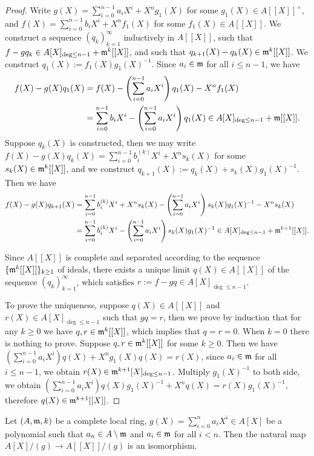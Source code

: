 \begin{proof}
\leanok
Write $g(X)=\sum_{i=0}^{n-1}a_iX^i+X^ng_1(X)$ for some $g_1(X)\in A[[X]]^\times$, and
$f(X)=\sum_{i=0}^{n-1}b_iX^i+X^nf_1(X)$ for some $f_1(X)\in A[[X]]$.
We construct a sequence $(q_k)_{k=1}^\infty$ inductively in $A[[X]]$,
such that $f-gq_k\in A[X]_{\deg\leq n-1}+{\mathfrak{m}}^k[[X]]$,
and such that $q_{k+1}(X)-q_k(X)\in{\mathfrak{m}}^k[[X]]$.
We construct $q_1(X):=f_1(X)g_1(X)^{-1}$.
Since $a_i\in{\mathfrak{m}}$ for all $i\leq n-1$, we have
\begin{align*}
f(X)-g(X)q_1(X)&=f(X)-\left(\sum_{i=0}^{n-1}a_iX^i\right)q_1(X)
-X^nf_1(X) \\
&=\sum_{i=0}^{n-1}b_iX^i-\left(\sum_{i=0}^{n-1}a_iX^i\right)q_1(X)
\in A[X]_{\deg\leq n-1}+{\mathfrak{m}}[[X]].
\end{align*}
Suppose $q_k(X)$ is constructed, then we may write
$f(X)-g(X)q_k(X)=\sum_{i=0}^{n-1}b_i^{(k)}X^i+X^ns_k(X)$
for some $s_k(X)\in{\mathfrak{m}}^k[[X]]$, and we construct
$q_{k+1}(X):=q_k(X)+s_k(X)g_1(X)^{-1}$. Then we have
\begin{align*}
f(X)-g(X)q_{k+1}(X)&=\sum_{i=0}^{n-1}b_i^{(k)}X^i+X^ns_k(X)
-\left(\sum_{i=0}^{n-1}a_iX^i\right)s_k(X)g_1(X)^{-1}
-X^ns_k(X) \\
&=\sum_{i=0}^{n-1}b_i^{(k)}X^i-\left(\sum_{i=0}^{n-1}a_iX^i\right)s_k(X)g_1(X)^{-1}
\in A[X]_{\deg\leq n-1}+{\mathfrak{m}}^{k+1}[[X]].
\end{align*}

Since $A[[X]]$ is complete and separated according to the sequence
$\{{\mathfrak{m}}^k[[X]]\}_{k\geq 1}$ of ideals, there exists a unique limit $q(X)\in A[[X]]$
of the sequence $(q_k)_{k=1}^\infty$, which satisfies $r:=f-gq\in A[X]_{\deg\leq n-1}$.

To prove the uniqueness, suppose $q(X)\in A[[X]]$ and $r(X)\in A[X]_{\deg\leq n-1}$
such that $gq=r$, then we prove by induction that for any $k\geq 0$
we have $q,r\in{\mathfrak{m}}^k[[X]]$, which implies that $q=r=0$.
When $k=0$ there is nothing to prove. Suppose $q,r\in{\mathfrak{m}}^k[[X]]$ for some $k\geq 0$.
Then we have $(\sum_{i=0}^{n-1}a_iX^i)q(X)+X^ng_1(X)q(X)=r(X)$,
since $a_i\in{\mathfrak{m}}$ for all $i\leq n-1$, we obtain $r(X)\in{\mathfrak{m}}^{k+1}[X]_{\deg\leq n-1}$.
Multiply $g_1(X)^{-1}$ to both side,
we obtain $(\sum_{i=0}^{n-1}a_iX^i)q(X)g_1(X)^{-1}+X^nq(X)=r(X)g_1(X)^{-1}$,
therefore $q(X)\in{\mathfrak{m}}^{k+1}[[X]]$.
\end{proof}

\begin{cor}
\label{isom-given-by-weierstrass-division}
\leanok
Let $(A,{\mathfrak{m}},k)$ be a complete local ring,
$g(X)=\sum_{i=0}^n a_iX^i\in A[X]$ be a polynomial
such that $a_n\in A\setminus{\mathfrak{m}}$ and $a_i\in{\mathfrak{m}}$ for all $i<n$.
Then the natural map $A[X]/(g)\to A[[X]]/(g)$
is an isomorphism.
\end{cor}


